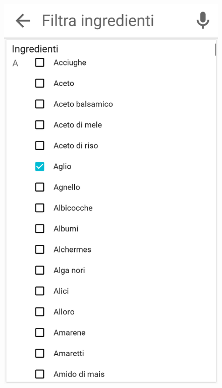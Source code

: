 \begin{figure}[H]
	\begin{minipage}{.49\textwidth}
		\includegraphics[width=\textwidth]{img/wireframe/search_page_esclusione.png}
	\end{minipage}
	\begin{minipage}{.49\textwidth}

\end{minipage}
\end{figure}
